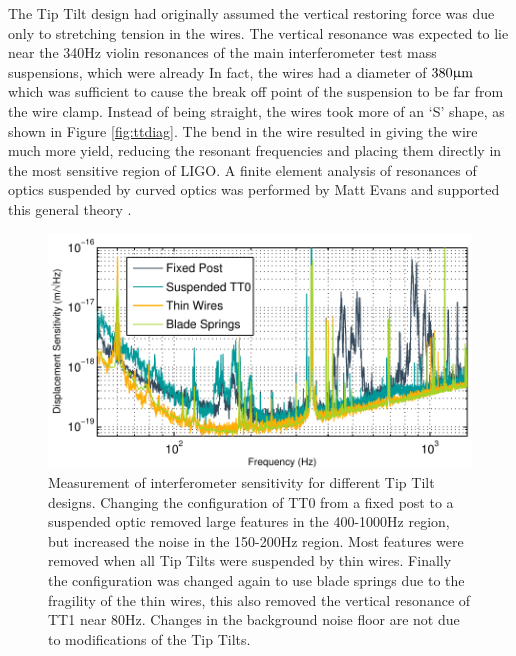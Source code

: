 The Tip Tilt design had originally assumed the vertical restoring force was due only to stretching tension in the wires. %
The vertical resonance was expected to lie near the 340Hz violin resonances of the main interferometer test mass suspensions, which were already In fact, the wires had a diameter of $380\upmu \rm m$ which was sufficient to cause the break off point of the suspension to be far from the wire clamp. %
Instead of being straight, the wires took more of an `S' shape, as shown in Figure \ref{fig:ttdiag}. %
The bend in the wire resulted in giving the wire much more yield, reducing the resonant frequencies and placing them directly in the most sensitive region of LIGO. %
A finite element analysis of resonances of optics suspended by curved optics was performed by Matt Evans and supported this general theory \cite{mattfea}.

\begin{figure}
  \begin{center}
  \leavevmode
  \includegraphics{figs-jitter/sensimprovement.pdf}
  \end{center}
  \caption[Measurement of interferometer sensitivity for different Tip Tilt designs.]{ Measurement of interferometer sensitivity for different Tip Tilt designs. Changing the configuration of TT0 from a fixed post to a suspended optic removed large features in the 400-1000Hz region, but increased the noise in the 150-200Hz region. Most features were removed when all Tip Tilts were suspended by thin wires. Finally the configuration was changed again to use blade springs due to the fragility of the thin wires, this also removed the vertical resonance of TT1 near 80Hz. Changes in the background noise floor are not due to modifications of the Tip Tilts.}
  \label{fig:sensimprovement}
\end{figure}

